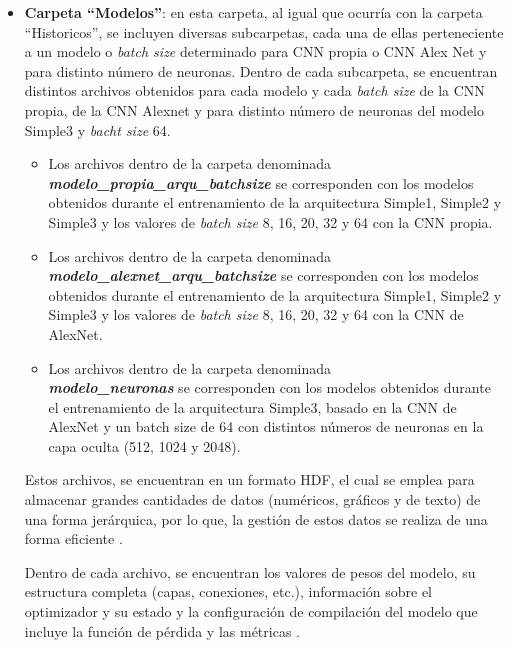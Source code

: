 \begin{itemize}
\begin{itemize}
        \item \textbf{Carpeta ``Modelos''}: en esta carpeta, al igual que ocurría con la carpeta ``Historicos'', se incluyen diversas subcarpetas, cada una de ellas perteneciente a un modelo o \textit{batch size} determinado para CNN propia o CNN Alex Net y para distinto número de neuronas. Dentro de cada subcarpeta, se encuentran distintos archivos obtenidos para cada modelo y cada \textit{batch size} de la CNN propia, de la CNN Alexnet y para distinto número de neuronas del modelo Simple3 y \textit{bacht size} 64. 

        \begin{itemize}
            \item Los archivos dentro de la carpeta denominada\\ \textit{\textbf{modelo\_propia\_arqu\_batchsize}} se corresponden con los modelos obtenidos durante el entrenamiento de la arquitectura Simple1, Simple2 y Simple3 y los valores de \textit{batch size} 8, 16, 20, 32 y 64 con la CNN propia.
            \item Los archivos dentro de la carpeta denominada\\ \textit{\textbf{modelo\_alexnet\_arqu\_batchsize}} se corresponden con los modelos obtenidos durante el entrenamiento de la arquitectura Simple1, Simple2 y Simple3 y los valores de \textit{batch size} 8, 16, 20, 32 y 64 con la CNN de AlexNet.
            \item Los archivos dentro de la carpeta denominada\\ \textit{\textbf{modelo\_neuronas}} se corresponden con los modelos obtenidos durante el entrenamiento de la arquitectura Simple3, basado en la CNN de AlexNet y un batch size de 64 con distintos números de neuronas en la capa oculta (512, 1024 y 2048). 
            
        \end{itemize}
    
        Estos archivos, se encuentran en un formato HDF, el cual se emplea para almacenar grandes cantidades de datos (numéricos, gráficos y de texto) de una forma jerárquica, por lo que, la gestión de estos datos se realiza de una forma eficiente \cite{filext24}. 
    
        Dentro de cada archivo, se encuentran los valores de pesos del modelo, su estructura completa (capas, conexiones, etc.), información sobre el optimizador y su estado y la configuración de compilación del modelo que incluye la función de pérdida y las métricas \cite{TensorFlowSave24}.
    

\end{itemize}
\end{itemize}
